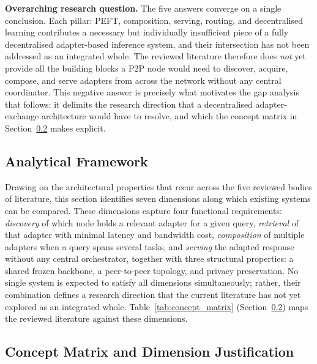 \noindent\textbf{Overarching research question.} The five answers converge on
a single conclusion. Each pillar: PEFT, composition, serving, routing, and
decentralised learning contributes a necessary but individually insufficient
piece of a fully decentralised adapter-based inference system, and their
intersection has not been addressed as an integrated whole. The reviewed
literature therefore does \textit{not} yet provide all the building blocks a
P2P node would need to discover, acquire, compose, and serve adapters from
across the network without any central coordinator. This negative answer is
precisely what motivates the gap analysis that follows: it delimits the
research direction that a decentralised adapter-exchange architecture would
have to resolve, and which the concept matrix in
Section~\ref{sec:synthesis_gap:matrix} makes explicit.

\subsection{Analytical Framework}
\label{sec:synthesis_gap:formulation}

Drawing on the architectural properties that recur across the five reviewed bodies of literature, this section identifies seven dimensions along which existing systems can be compared. These dimensions capture four functional requirements: \textit{discovery} of which node holds a relevant adapter for a given query, \textit{retrieval} of that adapter with minimal latency and bandwidth cost, \textit{composition} of multiple adapters when a query spans several tasks, and \textit{serving} the adapted response without any central orchestrator, together with three structural properties: a shared frozen backbone, a peer-to-peer topology, and privacy preservation. No single system is expected to satisfy all dimensions simultaneously; rather, their combination defines a research direction that the current literature has not yet explored as an integrated whole. Table~\ref{tab:concept_matrix} (Section~\ref{sec:synthesis_gap:matrix}) maps the reviewed literature against these dimensions.

\subsection{Concept Matrix and Dimension Justification}
\label{sec:synthesis_gap:matrix}

